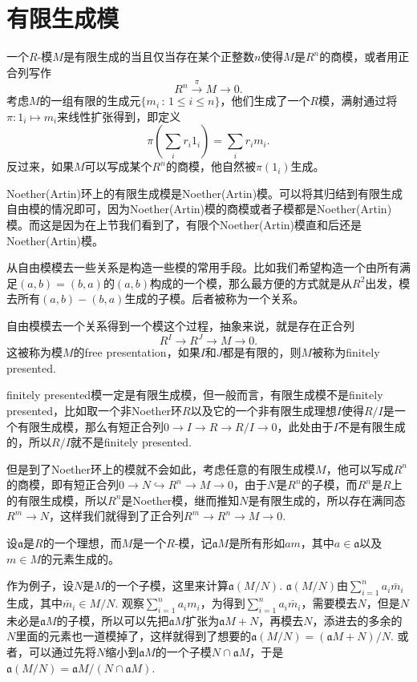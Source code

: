 \section{有限生成模}

\para 一个$R$-模$M$是有限生成的当且仅当存在某个正整数$n$使得$M$是$R^n$的商模，或者用正合列写作
\[
	R^n \xrightarrow{\pi} M\to 0.
\]
考虑$M$的一组有限的生成元$\{m_i\,:\, 1\leq i\leq n\}$，他们生成了一个$R$模，满射通过将$\pi:1_i\mapsto m_i$来线性扩张得到，即定义
\[
	\pi\left(\sum_i r_i 1_i\right)=\sum_i r_i m_i.
\]
反过来，如果$M$可以写成某个$R^n$的商模，他自然被$\pi(1_i)$生成。

\para Noether(Artin)环上的有限生成模是Noether(Artin)模。可以将其归结到有限生成自由模的情况即可，因为Noether(Artin)模的商模或者子模都是Noether(Artin)模。而这是因为在上节我们看到了，有限个Noether(Artin)模直和后还是Noether(Artin)模。

\para 从自由模模去一些关系是构造一些模的常用手段。比如我们希望构造一个由所有满足$(a,b)=(b,a)$的$(a,b)$构成的一个模，那么最方便的方式就是从$R^2$出发，模去所有$(a,b)-(b,a)$生成的子模。后者被称为一个关系。

自由模模去一个关系得到一个模这个过程，抽象来说，就是存在正合列
\[
	R^I\to R^J \to M\to 0.
\]
这被称为模$M$的free presentation，如果$I$和$J$都是有限的，则$M$被称为finitely presented.

finitely presented模一定是有限生成模，但一般而言，有限生成模不是finitely presented，比如取一个非Noether环$R$以及它的一个非有限生成理想$I$使得$R/I$是一个有限生成模，那么有短正合列$0\to I\to R \to R/I\to 0$，此处由于$I$不是有限生成的，所以$R/I$就不是finitely presented.

但是到了Noether环上的模就不会如此，考虑任意的有限生成模$M$，他可以写成$R^n$的商模，即有短正合列$0\to N \hookrightarrow R^n \to M\to 0$，由于$N$是$R^n$的子模，而$R^n$是$R$上的有限生成模，所以$R^n$是Noether模，继而推知$N$是有限生成的，所以存在满同态$R^m\to N$，这样我们就得到了正合列$R^m\to R^n\to M\to 0$.

\para 设$\mathfrak{a}$是$R$的一个理想，而$M$是一个$R$-模，记$\mathfrak{a}M$是所有形如$am$，其中$a\in \mathfrak{a}$以及$m\in M$的元素生成的。

作为例子，设$N$是$M$的一个子模，这里来计算$\mathfrak{a}(M/N)$. $\mathfrak{a}(M/N)$由$\sum_{i=1}^n a_i\bar{m}_i$生成，其中$\bar{m}_i\in M/N$. 观察$\sum_{i=1}^n a_i m_i$，为得到$\sum_{i=1}^n a_i\bar{m}_i$，需要模去$N$，但是$N$未必是$\mathfrak{a}M$的子模，所以可以先把$\mathfrak{a}M$扩张为$\mathfrak{a}M+N$，再模去$N$，添进去的多余的$N$里面的元素也一道模掉了，这样就得到了想要的$\mathfrak{a}(M/N)=(\mathfrak{a}M+N)/N$. 或者，可以通过先将$N$缩小到$\mathfrak{a}M$的一个子模$N\cap \mathfrak{a}M$，于是$\mathfrak{a}(M/N)=\mathfrak{a}M/(N\cap \mathfrak{a}M)$.

